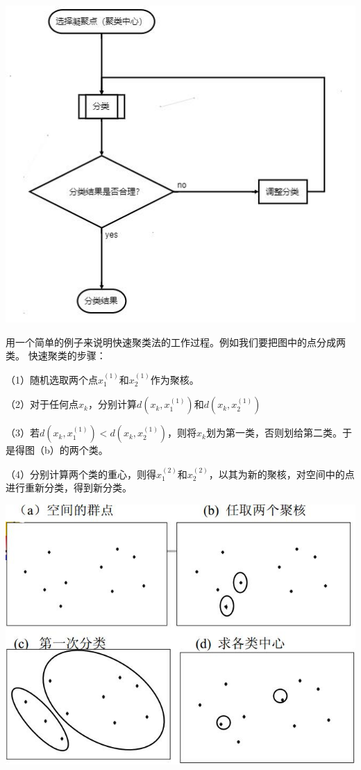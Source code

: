 \documentclass[]{ctexbook}
\begin{document}
\includegraphics[width=1\linewidth,height=0.45\textheight]{fig/fig22}

用一个简单的例子来说明快速聚类法的工作过程。例如我们要把图中的点分成两类。 快速聚类的步骤：

（1）随机选取两个点\(x_1^{(1)}\)和\(x_2^{(1)}\)作为聚核。

（2）对于任何点\(x_k\)，分别计算\(d(x_k,x_1^{(1)})\)和\(d(x_k,x_2^{(1)})\)

（3）若\(d(x_k,x_1^{(1)})< d(x_k,x_2^{(1)})\)，则将\(x_k\)划为第一类，否则划给第二类。于是得图（b）的两个类。

（4）分别计算两个类的重心，则得\(x_1^{(2)}\)和\(x_2^{(2)}\)，以其为新的聚核，对空间中的点进行重新分类，得到新分类。

\includegraphics[width=1\linewidth,height=0.35\textheight]{fig/fig23}
\end{document}
